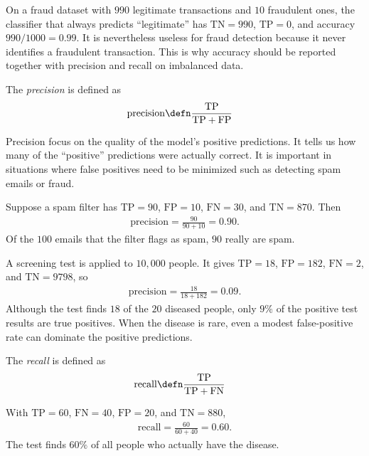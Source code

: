\documentclass[a4paper, 12pt]{book}
\begin{document}
\begin{example}
    On a fraud dataset with $990$ legitimate transactions and $10$ fraudulent
    ones, the classifier that always predicts ``legitimate'' has
    $\mathrm{TN}=990$, $\mathrm{TP}=0$, and accuracy $990/1000=0.99$. It is
    nevertheless useless for fraud detection because it never identifies a
    fraudulent transaction. This is why accuracy should be reported together
    with precision and recall on imbalanced data.
\end{example}

\begin{definition}
    The \emph{precision} is defined as
    \begin{align}
        \mathrm{precision} &\defn \frac{\mathrm{TP}}{\mathrm{TP}+\mathrm{FP}}
    \end{align}
\end{definition}
Precision focus on the quality of the model’s positive predictions. It tells us how many of the ``positive'' predictions were actually correct. It is important in situations where false positives need to be minimized such as detecting spam emails or fraud.
\begin{example}
    Suppose a spam filter has $\mathrm{TP}=90$, $\mathrm{FP}=10$,
    $\mathrm{FN}=30$, and $\mathrm{TN}=870$. Then
    \begin{align}
        \mathrm{precision} = \frac{90}{90+10} = 0.90.
    \end{align}
    Of the $100$ emails that the filter flags as spam, $90$ really are spam.
\end{example}

\begin{example}
    A screening test is applied to $10{,}000$ people. It gives
    $\mathrm{TP}=18$, $\mathrm{FP}=182$, $\mathrm{FN}=2$, and
    $\mathrm{TN}=9798$, so
    \begin{align}
        \mathrm{precision} = \frac{18}{18+182} = 0.09.
    \end{align}
    Although the test finds $18$ of the $20$ diseased people, only $9\%$ of the
    positive test results are true positives. When the disease is rare, even a
    modest false-positive rate can dominate the positive predictions.
\end{example}

\begin{definition}
    The \emph{recall} is defined as
    \begin{align}
        \mathrm{recall} &\defn \frac{\mathrm{TP}}{\mathrm{TP}+\mathrm{FN}}
    \end{align}
\end{definition}
\begin{example}
    With $\mathrm{TP}=60$, $\mathrm{FN}=40$, $\mathrm{FP}=20$, and
    $\mathrm{TN}=880$,
    \begin{align}
        \mathrm{recall} = \frac{60}{60+40} = 0.60.
    \end{align}
    The test finds $60\%$ of all people who actually have the disease.
\end{example}
\end{document}

